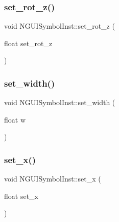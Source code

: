 \hypertarget{class_n_g_u_i_symbol_inst_aeb99dce091d27b4a27cd76f3cb21b7b5}{}\label{class_n_g_u_i_symbol_inst_aeb99dce091d27b4a27cd76f3cb21b7b5} 
\subsubsection{\texorpdfstring{set\+\_\+rot\+\_\+z()}{set\_rot\_z()}}
{\footnotesize\ttfamily void N\+G\+U\+I\+Symbol\+Inst\+::set\+\_\+rot\+\_\+z (\begin{DoxyParamCaption}\item[{float}]{set\+\_\+rot\+\_\+z }\end{DoxyParamCaption})}

\hypertarget{class_n_g_u_i_symbol_inst_a420a511551d1b8c70f0beea1bdde450e}{}\label{class_n_g_u_i_symbol_inst_a420a511551d1b8c70f0beea1bdde450e} 
\subsubsection{\texorpdfstring{set\+\_\+width()}{set\_width()}}
{\footnotesize\ttfamily void N\+G\+U\+I\+Symbol\+Inst\+::set\+\_\+width (\begin{DoxyParamCaption}\item[{float}]{w }\end{DoxyParamCaption})}

\hypertarget{class_n_g_u_i_symbol_inst_a326f6e238bd4a84f7192f422b8cae087}{}\label{class_n_g_u_i_symbol_inst_a326f6e238bd4a84f7192f422b8cae087} 
\subsubsection{\texorpdfstring{set\+\_\+x()}{set\_x()}}
{\footnotesize\ttfamily void N\+G\+U\+I\+Symbol\+Inst\+::set\+\_\+x (\begin{DoxyParamCaption}\item[{float}]{set\+\_\+x }\end{DoxyParamCaption})}

\hypertarget{class_n_g_u_i_symbol_inst_a47fe106e686ce5a7a4651e0db73595c5}{}\label{class_n_g_u_i_symbol_inst_a47fe106e686ce5a7a4651e0db73595c5} 
